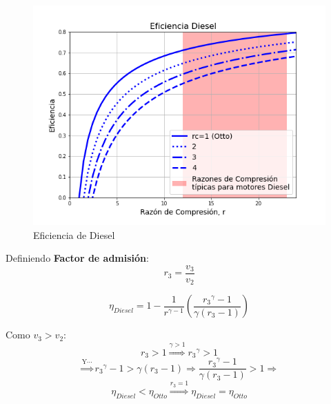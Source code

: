             \begin{multicols}{2}
                \begin{figure}
                \includegraphics[width=\textwidth]{img/graficos/ef_diesel.png}
                    \caption{Eficiencia de Diesel}
                    \label{fig:ef_diesel}
                \end{figure}
                    
                Definiendo \textbf{Factor de admisión}:
                \begin{equation}
                \label{factor_adm}
                    r_{3} = \frac{v_{3}}{v_{2}}
                \end{equation}
                
                \begin{equation}
                \label{eficiencia_diesel}
                    \eta_{Diesel}=1-\frac{1}{r^{\gamma - 1}}\left ( \frac{{r_{3}}^{\gamma}-1}{\gamma (r_{3}-1)} \right )
                \end{equation}
            
                Como \(v_{3} > v_{2}\):
                \[r_{3} > 1 \overset{\gamma > 1}{\Rightarrow} {r_{3}}^{\gamma} > 1\]
                \[\overset{\text{Y}\cdots}{\Rightarrow} {r_{3}}^{\gamma} - 1 > \gamma (r_{3} - 1) \Rightarrow \frac{{r_{3}}^{\gamma} - 1}{\gamma (r_{3} - 1)} > 1 \Rightarrow \]
                \[\eta_{Diesel} < \eta_{Otto} \overset{r_{3} = 1}{\Rightarrow} \eta_{Diesel} = \eta_{Otto}\]
            \end{multicols}
    

